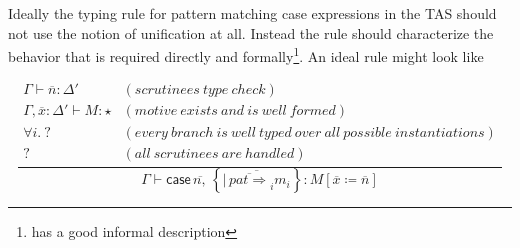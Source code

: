 
Ideally the typing rule for pattern matching case expressions in the TAS should not use the notion of unification at all.
Instead the rule should characterize the behavior that is required directly and formally\footnote{\cite{coquand1992pattern} has a good informal description}.
An ideal rule might look like

\[
\frac{\begin{array}{cl}
\Gamma\vdash\overline{n}:\Delta' & (scrutinees\ type\ check)\\
\Gamma,\overline{x}:\Delta'\vdash M:\star & (motive\ exists\ and\ is\ well\ formed)\\
\forall i.\:? & (every\ branch\ is\ well\ typed\ over\ all\ possible\ instantiations)\\
? & (all\ scrutinees\ are\ handled)
\end{array}}{\Gamma\vdash\mathsf{case}\,\overline{n,}\,\left\{ \overline{|\,\overline{pat\Rightarrow}_{i}m_{i}}\right\} :M\left[\overline{x}\coloneqq\overline{n}\right]}
\]


